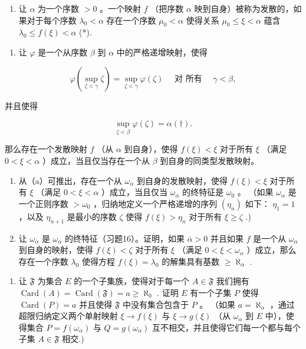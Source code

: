 \begin{enumerate}
\def\labelenumi{\arabic{enumi}.}
\setcounter{enumi}{22}
\tightlist
\item
  让 \(\alpha\) 为一个序数 \(>0\) 。一个映射 \(f\) （把序数 \(\alpha\) 映到自身）被称为发散的，如果对于每个序数 \(\lambda_0 < \alpha\) 存在一个序数 \(\mu_0 < \alpha\) 使得关系 \(\mu_0 \leqslant \xi < \alpha\) 蕴含 \(\lambda_0 \leqslant f(\xi) < \alpha\) (*).
\end{enumerate}

\begin{enumerate}
\def\labelenumi{(\alph{enumi})}
\tightlist
\item
  让 \(\varphi\) 是一个从序数 \(\beta\) 到 \(\alpha\) 中的严格递增映射，使得
\end{enumerate}

\[
\varphi (\sup _ {\zeta <   \gamma} \zeta) = \sup _ {\zeta <   \gamma} \varphi (\zeta) \quad \text { 对   所有 } \quad \gamma <   \beta ,
\]

并且使得

\[
\sup _ {\zeta <   \beta} \varphi (\zeta) = \alpha (\dagger).
\]

那么存在一个发散映射 \(f\) （从 \(\alpha\) 到自身），使得 \(f(\xi) < \xi\) 对于所有 \(\xi\) （满足 \(0 < \xi < \alpha\) ）成立，当且仅当存在一个从 \(\beta\) 到自身的同类型发散映射。

\begin{enumerate}
\def\labelenumi{(\alph{enumi})}
\setcounter{enumi}{1}
\item
  从（a）可推出，存在一个从 \(\omega_{\alpha}\) 到自身的发散映射，使得 \(f(\xi) < \xi\) 对于所有 \(\xi\) （满足 \(0 < \xi < \alpha\) ）成立，当且仅当 \(\omega_{\alpha}\) 的终特征是 \(\omega_0\) 。 （如果 \(\omega_{\alpha}\) 是一个正则序数 \(> \omega_0\) ，归纳地定义一个严格递增的序列 \((\eta_n)\) 如下： \(\eta_1 = 1\) ，以及 \(\eta_{n+1}\) 是最小的序数 \(\zeta\) 使得 \(f(\xi) > \eta_n\) 对于所有 \(\xi \geqslant \zeta\) .)
\item
  让 \(\omega_{\overline{\alpha}}\) 是 \(\omega_{\alpha}\) 的终特征（习题16）。证明，如果 \(\overline{\alpha} > 0\) 并且如果 \(f\) 是一个从 \(\omega_{\alpha}\) 到自身的映射，使得 \(f(\xi) < \zeta\) 对于所有 \(\xi\) （满足 \(0 < \xi < \omega_{\alpha}\) ）成立，那么存在一个序数 \(\lambda_0\) 使得方程 \(f(\xi) = \lambda_0\) 的解集具有基数 \(\geqslant \aleph_{\overline{\alpha}}\) .
\end{enumerate}

\begin{enumerate}
\def\labelenumi{\arabic{enumi}.}
\setcounter{enumi}{23}
\tightlist
\item
  让 \(\mathfrak{F}\) 为集合 \(E\) 的一个子集族，使得对于每一个 \(A \in \mathfrak{F}\) 我们拥有 \(\operatorname{Card}(A) = \operatorname{Card}(\mathfrak{F}) = a \geqslant \aleph_0\) . 证明 \(E\) 有一个子集 \(P\) 使得 \(\operatorname{Card}(P) = a\) 并且使得 \(\mathfrak{F}\) 中没有集合包含于 \(P\) 。 （如果 \(a = \aleph_{\alpha}\) ，通过超限归纳定义两个单射映射 \(\xi \to f(\xi)\) 与 \(\xi \to g(\xi)\) （从 \(\omega_{\alpha}\) 到 \(E\) 中），使得集合 \(P = f(\omega_{\alpha})\) 与 \(Q = g(\omega_{\alpha})\) 互不相交，并且使得它们每一个都与每个子集 \(A \in \mathfrak{F}\) 相交.)
\end{enumerate}


